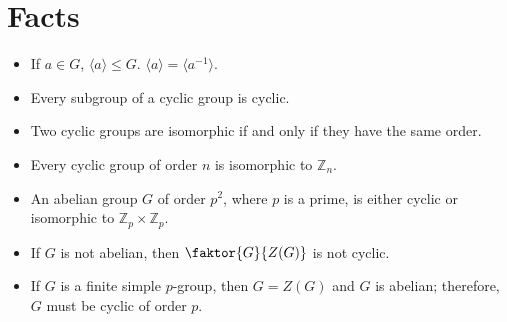 \documentclass[12pt]{report}
\theoremstyle{definition}
\newcommand{\gen}[1]{{\langle}#1{\rangle}}
\begin{document}
\section{Facts}
\begin{itemize}
	\item If $a\in G$, $\gen{a}\leq G$. $\gen{a}=\gen{a^{-1}}$.
	\item Every subgroup of a cyclic group is cyclic.
	\item Two cyclic groups are isomorphic if and only if they have the same order.
	\item Every cyclic group of order $n$ is isomorphic to $\mathbb{Z}_n$.
	\item An abelian group $G$ of order $p^2$, where $p$ is a prime, is either cyclic or isomorphic to $\mathbb{Z}_p\times\mathbb{Z}_p$.
	\item If $G$ is not abelian, then $\faktor{G}{Z(G)}$ is not cyclic.
	\item If $G$ is a finite simple $p$-group, then $G=Z(G)$ and $G$ is abelian; therefore, $G$ must be cyclic of order $p$.
\end{itemize}
\end{document}
